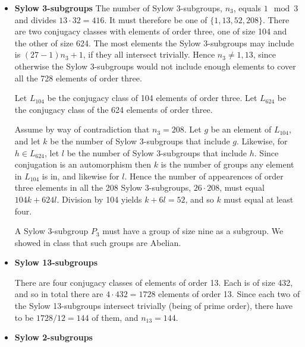 \documentclass[11pt]{article} \usepackage{amssymb}
\begin{document}
\begin{enumerate}
\begin{enumerate}
    \begin{itemize}
    \item {\bf Sylow 3-subgroups}
      The number of Sylow 3-subgroups, $n_3$, equals $1\mod 3$ and divides
      $13\cdot 32=416$. It must therefore be one of $\{1,13,52,208\}$. There are two 
      conjugacy classes with elements of order three, one of size 104 and
      the other of size 624. The most elements the Sylow 3-subgroups may 
      include is $(27-1)n_3+1$, if they all 
      intersect trivially. Hence $n_3\neq 1,13$, since otherwise
      the Sylow 3-subgroups would not include enough elements to cover all the
      728 elements of order three.
      
      Let $L_{104}$ be the conjugacy class of 104 elements of order three. Let
      $L_{624}$ be the conjugacy class of the 624 elements of order three. 

      Assume by way of contradiction that $n_3=208$. Let $g$ be an element of
      $L_{104}$, and let $k$ be the number of Sylow 3-subgroups that include
      $g$. Likewise, for $h\in L_{624}$, let $l$ be the number of Sylow 
      3-subgroups that include $h$. Since conjugation is an automorphism then
      $k$ is the number of groups any element in $L_{104}$ is in, and likewise
      for $l$. Hence the number of appearences of order three elements in all 
      the 208 Sylow 3-subgroups, $26\cdot 208$, must equal $104k+624l$. Division
      by 104 yields $k+6l=52$, and so $k$ must equal at least four.

      A Sylow 3-subgroup $P_3$ must have a group of size nine as a subgroup.
      We showed in class that such groups are Abelian. 
      
    \item {\bf Sylow 13-subgroups}
      
      There are four conjugacy classes of elements of order 13. Each is of size
      432, and so in total there
      are $4\cdot 432=1728$ elements of order 13. Since each two
      of the Sylow 13-subgroups intersect trivially (being of prime order), 
      there have to be $1728/12=144$ of them, and $n_{13}=144$.

    \item {\bf Sylow 2-subgroups}
      

\end{itemize}
\end{enumerate}
\end{enumerate}
\end{document}
